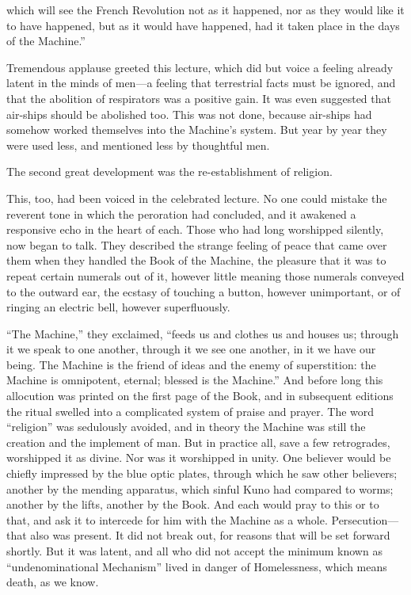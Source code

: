 which will see the French Revolution not as it happened, nor as they would like it to have happened, but as it would have happened, had it taken place in the days of the Machine.'' %

Tremendous applause greeted this lecture, which did but voice a feeling already latent in the minds of men---a feeling that terrestrial facts must be ignored, and that the abolition of respirators was a positive gain. It was even suggested that air-ships should be abolished too. This was not done, because air-ships had somehow worked themselves into the Machine's system. But year by year they were used less, and mentioned less by thoughtful men.

The second great development was the re-establishment of religion.

This, too, had been voiced in the celebrated lecture. No one could mistake the reverent tone in which the peroration had concluded, and it awakened a responsive echo in the heart of each. Those who had long worshipped silently, now began to talk. They described the strange feeling of peace that came over them when they handled the Book of the Machine, the pleasure that it was to repeat certain numerals out of it, however little meaning those numerals conveyed to the outward ear, the ecstasy of touching a button, however unimportant, or of ringing an electric bell, however superfluously.

``The Machine,'' they exclaimed, ``feeds us and clothes us and houses us; through it we speak to one another, through it we see one another, in it we have our being. The Machine is the friend of ideas and the enemy of superstition: the Machine is omnipotent, eternal; blessed is the Machine.'' And before long this allocution was printed on the first page of the Book, and in subsequent editions the ritual swelled into a complicated system of praise and prayer. The word ``religion'' was sedulously avoided, and in theory the Machine was still the creation and the implement of man. But in practice all, save a few retrogrades, worshipped it as divine. Nor was it worshipped in unity. One believer would be chiefly impressed by the blue optic plates, through which he saw other believers; another by the mending apparatus, which sinful Kuno had compared to worms; another by the lifts, another by the Book. And each would pray to this or to that, and ask it to intercede for him with the Machine as a whole. Persecution---that also was present. It did not break out, for reasons that will be set forward shortly. But it was latent, and all who did not accept the minimum known as ``undenominational Mechanism'' lived in danger of Homelessness, which means death, as we know. %

